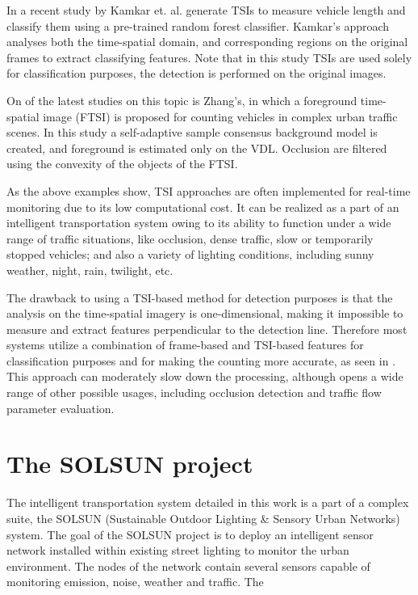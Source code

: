 In a recent study by Kamkar et. al. generate TSIs to measure vehicle length and classify them using a pre-trained random forest classifier\cite{Kamkar2016}. 
Kamkar's approach analyses both the time-spatial domain, and corresponding regions on the original frames to extract classifying features.
Note that in this study TSIs are used solely for classification purposes, the detection is performed on the original images.

On of the latest studies on this topic is Zhang's, in which a foreground time-spatial image (FTSI) is proposed for counting vehicles in complex urban traffic scenes\cite{Zhang2016}.
In this study a self-adaptive sample consensus background model is created, and foreground is estimated only on the VDL.
Occlusion are filtered using the convexity of the objects of the FTSI.

As the above examples show, TSI approaches are often implemented for real-time monitoring due to its low computational cost.
It can be realized as a part of an intelligent transportation system owing to its ability to function under a wide range of traffic situations, like occlusion, dense traffic, slow or temporarily stopped vehicles; and also a variety of lighting conditions, including sunny weather, night, rain, twilight, etc.

The drawback to using a TSI-based method for detection purposes is that the analysis on the time-spatial imagery is one-dimensional, making it impossible to measure and extract features perpendicular to the detection line.
Therefore most systems utilize a combination of frame-based and TSI-based features for classification purposes and for making the counting more accurate, as seen in \cite{Kryjak2014, Yang2013a}. 
This approach can moderately slow down the processing, although opens a wide range of other possible usages, including occlusion detection and traffic flow parameter evaluation.
\section{The SOLSUN project}
The intelligent transportation system detailed in this work is a part of a complex suite, the SOLSUN (Sustainable Outdoor Lighting \& Sensory Urban Networks) system.
The goal of the SOLSUN project is to deploy an intelligent sensor network installed within existing street lighting to monitor the urban environment.
The nodes of the network contain several sensors capable of monitoring emission, noise, weather and traffic.
The 

